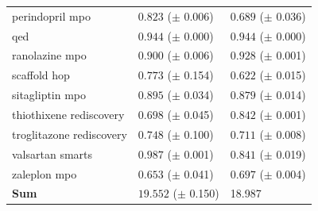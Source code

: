 \documentclass{article} %
\begin{document}
\begin{table}[ht]
\begin{tabularx}{\linewidth}{l|>{}p{2.2cm} Y }
\small{perindopril mpo} & $\mathbf{0.823}$ {\tiny ($\pm$ 0.006)} & $0.689$ {\tiny ($\pm$ 0.036)} \\
\small{qed} & $\mathbf{0.944}$ {\tiny ($\pm$ 0.000)} & $\mathbf{0.944}$ {\tiny ($\pm$ 0.000)} \\
\small{ranolazine mpo} & $0.900$ {\tiny ($\pm$ 0.006)} & $\mathbf{0.928}$ {\tiny ($\pm$ 0.001)} \\
\small{scaffold hop} & $\mathbf{0.773}$ {\tiny ($\pm$ 0.154)} & $\mathbf{0.622}$ {\tiny ($\pm$ 0.015)} \\
\small{sitagliptin mpo} & $\mathbf{0.895}$ {\tiny ($\pm$ 0.034)} & $\mathbf{0.879}$ {\tiny ($\pm$ 0.014)} \\
\small{thiothixene rediscovery} & $0.698$ {\tiny ($\pm$ 0.045)} & $\mathbf{0.842}$ {\tiny ($\pm$ 0.001)} \\
\small{troglitazone rediscovery} & $\mathbf{0.748}$ {\tiny ($\pm$ 0.100)} & $\mathbf{0.711}$ {\tiny ($\pm$ 0.008)} \\
\small{valsartan smarts} & $\mathbf{0.987}$ {\tiny ($\pm$ 0.001)} & $0.841$ {\tiny ($\pm$ 0.019)} \\
\small{zaleplon mpo} & $0.653$ {\tiny ($\pm$ 0.041)} & $\mathbf{0.697}$ {\tiny ($\pm$ 0.004)} \\
\midrule
\textbf{Sum} & $\mathbf{19.552}$ {\tiny ($\pm$ 0.150)} & 18.987 \\
\bottomrule
\end{tabularx}
\end{table}
\end{document}
